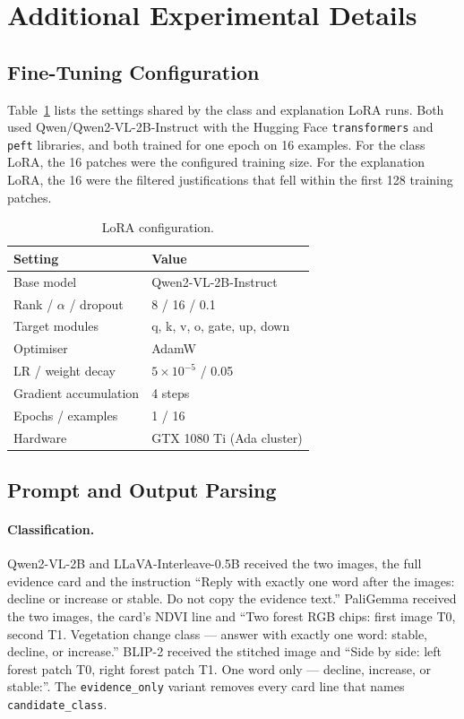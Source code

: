\documentclass[11pt]{article}
\begin{document}

\clearpage
\appendix

\section{Additional Experimental Details}

\subsection{Fine-Tuning Configuration}

Table~\ref{tab:ftconfig} lists the settings shared by the class and
explanation LoRA runs. Both used Qwen/Qwen2-VL-2B-Instruct with the
Hugging Face \texttt{transformers} and \texttt{peft} libraries, and both
trained for one epoch on 16 examples. For the class LoRA, the 16
patches were the configured training size. For the explanation LoRA,
the 16 were the filtered justifications that fell within the first 128
training patches.

\begin{table}[ht]
\centering
\small
\begin{tabular}{@{}ll@{}}
\toprule
Setting & Value \\
\midrule
Base model & Qwen2-VL-2B-Instruct \\
Rank / $\alpha$ / dropout & 8 / 16 / 0.1 \\
Target modules & q, k, v, o, gate, up, down \\
Optimiser & AdamW \\
LR / weight decay & $5\times10^{-5}$ / 0.05 \\
Gradient accumulation & 4 steps \\
Epochs / examples & 1 / 16 \\
Hardware & GTX 1080 Ti (Ada cluster) \\
\bottomrule
\end{tabular}
\caption{LoRA configuration.}
\label{tab:ftconfig}
\end{table}

\subsection{Prompt and Output Parsing}

\paragraph{Classification.} Qwen2-VL-2B and LLaVA-Interleave-0.5B
received the two images, the full evidence card and the instruction
``Reply with exactly one word after the images: decline or increase or
stable. Do not copy the evidence text.'' PaliGemma received the two
images, the card's NDVI line and ``Two forest RGB chips: first image T0,
second T1. Vegetation change class --- answer with exactly one word:
stable, decline, or increase.'' BLIP-2 received the stitched image and
``Side by side: left forest patch T0, right forest patch T1. One word
only --- decline, increase, or stable:''. The \texttt{evidence\_only}
variant removes every card line that names \texttt{candidate\_class}.
\end{document}
